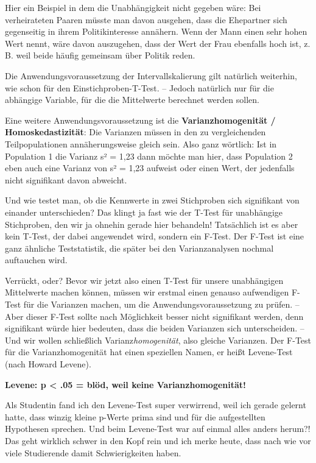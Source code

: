 \documentclass[
]{book}
\begin{document}
Hier ein Beispiel in dem die Unabhängigkeit nicht gegeben wäre: Bei verheirateten Paaren müsste man davon ausgehen, dass die Ehepartner sich gegenseitig in ihrem Politikinteresse annähern. Wenn der Mann einen sehr hohen Wert nennt, wäre davon auszugehen, dass der Wert der Frau ebenfalls hoch ist, z. B. weil beide häufig gemeinsam über Politik reden.

Die Anwendungsvoraussetzung der Intervallskalierung gilt natürlich weiterhin, wie schon für den Einstichproben-T-Test. -- Jedoch natürlich nur für die abhängige Variable, für die die Mittelwerte berechnet werden sollen.

Eine weitere Anwendungsvoraussetzung ist die \textbf{Varianzhomogenität / Homoskedastizität}: Die Varianzen müssen in den zu vergleichenden Teilpopulationen annäherungsweise gleich sein. Also ganz wörtlich: Ist in Population 1 die Varianz s² = 1,23 dann möchte man hier, dass Population 2 eben auch eine Varianz von s² = 1,23 aufweist oder einen Wert, der jedenfalls nicht signifikant davon abweicht.

Und wie testet man, ob die Kennwerte in zwei Stichproben sich signifikant von einander unterschieden? Das klingt ja fast wie der T-Test für unabhängige Stichproben, den wir ja ohnehin gerade hier behandeln! Tatsächlich ist es aber kein T-Test, der dabei angewendet wird, sondern ein F-Test. Der F-Test ist eine ganz ähnliche Teststatistik, die später bei den Varianzanalysen nochmal auftauchen wird.

Verrückt, oder? Bevor wir jetzt also einen T-Test für unsere unabhängigen Mittelwerte machen können, müssen wir erstmal einen genauso aufwendigen F-Test für die Varianzen machen, um die Anwendungsvoraussetzung zu prüfen. -- Aber dieser F-Test sollte nach Möglichkeit besser nicht signifikant werden, denn signifikant würde hier bedeuten, dass die beiden Varianzen sich unterscheiden. -- Und wir wollen schließlich Varianz\emph{homogenität}, also gleiche Varianzen. Der F-Test für die Varianzhomogenität hat einen speziellen Namen, er heißt Levene-Test (nach Howard Levene).

\leavevmode\hypertarget{danger_levene}{}%
\textbf{Levene: p \textless{} .05 = blöd, weil keine Varianzhomogenität!}

Als Studentin fand ich den Levene-Test super verwirrend, weil ich gerade gelernt hatte, dass winzig kleine p-Werte prima sind und für die aufgestellten Hypothesen sprechen. Und beim Levene-Test war auf einmal alles anders herum?! Das geht wirklich schwer in den Kopf rein und ich merke heute, dass nach wie vor viele Studierende damit Schwierigkeiten haben.
\end{document}
